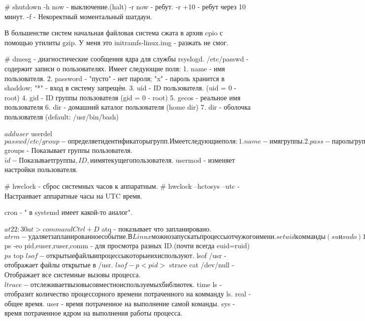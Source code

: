 # shutdown -h now - выключение.(halt)
           -r now - ребут.
           -r +10 - ребут через 10 минут.
           -f - Некоректный моментальный шатдаун.

В большенстве систем начальная файловая система сжата в архив cpio с помощью
утилиты gzip.
У меня это initramfs-linux.img - разжать не смог.

# dmesg     - диагностические сообщения ядра для службы rsyslogd.
/etc/passwd - содержит записи о пользователях. Имеет следующие поля:
1. name      - имя пользователя.
2. password  - "пусто" - нет пароля; "x" - пароль хранится в shaddow; "*" - вход 
               в систему запрещён.
3. uid       - ID пользователя. (uid = 0 - root)
4. gid       - ID группы пользователя (gid = 0 - root)
5. gecos     - реальное имя пользователя
6. dir       - домашний каталог пользователя (home dir)
7. dir       - оболочка пользователя (default: /usr/bin/bash) 

$ adduser
$ userdel
$ passwd

/etc/group - определяет идентификаторы групп. Имеет следующие поля:
1. name - имя группы.
2. pass - пароль группы.
3. GID  - ID группы.
4. user - участники группы в дополнение тем которые указаны в /etc/password

$ groups - Показывает группы пользователя.
$ id - Показывает группы, ID, и имя текущего пользователя.
$ usermod - изменяет настройки пользователя.

# hwclock - сброс системных часов к аппаратным.
# hwclock --hctosys --utc - Настраивает аппаратные часы на UTC время.

cron - " в systemd имеет какой-то аналог".

$ at 22:30
at> command
Ctrl+D
$ atq - показывает что запланировано.
$ atrm - удаляет запланированное событие.

В Linux можно запускать процессы от чужого имени. setuid комманды (su и sudo)
1. euid - эфективный ID. (исполнитель)
2. ruid - реальный ID.   (владелец)
3. suid - сохраненный ID.
4. fsuid - ID пользователя файловой системой.

$ ps -eo pid,euser,ruser,comm - для просмотра разных ID.(почти всегда euid=ruid)
$ ps
$ top 
$ lsof - открытые файлы и процессы которые их используют.
$ lsof /usr - отображает файлы открытые в /usr.
$ lsof -p <pid>
$ strace cat /dev/null - Отображает все системные вызовы процесса.
$ ltrace - отслеживает вызовы совместно используемых библиотек.
$ time ls - отобразит количество процессорного времени потраченного на комманду ls.
real - общее время.
user - время потраченное на выполнение самой команды.
sys  - время потраченное ядром на выполнения работы процесса.

